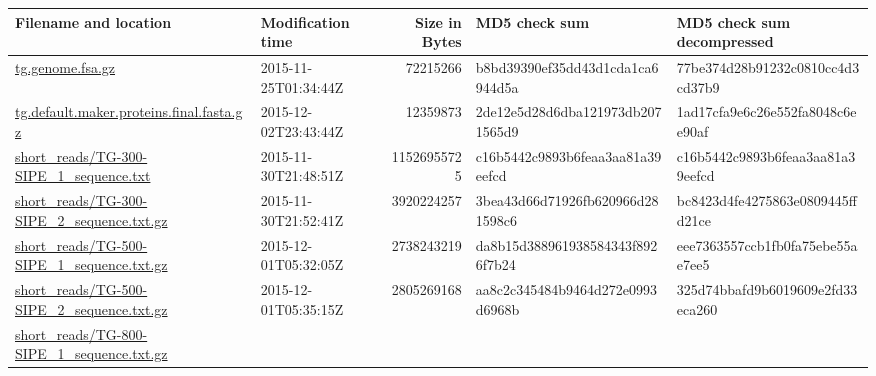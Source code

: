 \documentclass[12pt,a4paper]{scrartcl}
\begin{document}
\begin{table}
\centering
{}
\begin{tabularx}{\linewidth}{>{\ttfamily\tiny}X>{\ttfamily\tiny}l>{\ttfamily\tiny}r*{2}{>{\ttfamily\tiny}l}}\toprule
Filename and location                                          & Modification time    & Size in Bytes     & MD5 check sum                    & MD5 check sum decompressed \\ \midrule
\href{http://weatherby.genetics.utah.edu/seq_transf/tg.genome.fsa.gz}{tg.genome.fsa.gz}
                                                               & 2015-11-25T01:34:44Z &    \num{72215266} & b8bd39390ef35dd43d1cda1ca6944d5a & 77be374d28b91232c0810cc4d3cd37b9 \\
\href{http://weatherby.genetics.utah.edu/seq_transf/tg.default.maker.proteins.final.fasta.gz}{tg.default.maker.proteins.final.fasta.gz}
                                                               & 2015-12-02T23:43:44Z &    \num{12359873} & 2de12e5d28d6dba121973db2071565d9 & 1ad17cfa9e6c26e552fa8048c6ee90af \\
\href{http://weatherby.genetics.utah.edu/seq_transf/short_reads/TG-300-SIPE_1_sequence.txt}{short\_reads/TG-300-SIPE\_1\_sequence.txt}
                                                               & 2015-11-30T21:48:51Z & \num{11526955725} & c16b5442c9893b6feaa3aa81a39eefcd & c16b5442c9893b6feaa3aa81a39eefcd \\
\href{http://weatherby.genetics.utah.edu/seq_transf/short_reads/TG-300-SIPE_2_sequence.txt.gz}{short\_reads/TG-300-SIPE\_2\_sequence.txt.gz}
                                                               & 2015-11-30T21:52:41Z &  \num{3920224257} & 3bea43d66d71926fb620966d281598c6 & bc8423d4fe4275863e0809445ffd21ce \\
\href{http://weatherby.genetics.utah.edu/seq_transf/short_reads/TG-500-SIPE_1_sequence.txt.gz}{short\_reads/TG-500-SIPE\_1\_sequence.txt.gz}
                                                               & 2015-12-01T05:32:05Z &  \num{2738243219} & da8b15d388961938584343f8926f7b24 & eee7363557ccb1fb0fa75ebe55ae7ee5 \\
\href{http://weatherby.genetics.utah.edu/seq_transf/short_reads/TG-500-SIPE_2_sequence.txt.gz}{short\_reads/TG-500-SIPE\_2\_sequence.txt.gz}
                                                               & 2015-12-01T05:35:15Z &  \num{2805269168} & aa8c2c345484b9464d272e0993d6968b & 325d74bbafd9b6019609e2fd33eca260 \\
\href{http://weatherby.genetics.utah.edu/seq_transf/short_reads/TG-800-SIPE_1_sequence.txt.gz}{short\_reads/TG-800-SIPE\_1\_sequence.txt.gz}

\end{tabularx}
\end{table}
\end{document}

